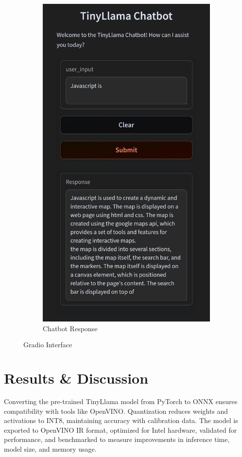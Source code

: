 \documentclass{josis}
\begin{document}
\begin{figure}[H]
\begin{subfigure}[b]{0.45\textwidth}
    \centering
    \includegraphics[width=\textwidth]{rep.jpg}
    \caption{Chatbot Response}
    \label{fig:inference}
\end{subfigure}
\caption{Gradio Interface}
\label{fig:model-comparison}
\end{figure}
\section{Results \& Discussion}
Converting the pre-trained TinyLlama model from PyTorch to ONNX ensures compatibility with tools like OpenVINO. Quantization reduces weights and activations to INT8, maintaining accuracy with calibration data. The model is exported to OpenVINO IR format, optimized for Intel hardware, validated for performance, and benchmarked to measure improvements in inference time, model size, and memory usage.
\end{document}
